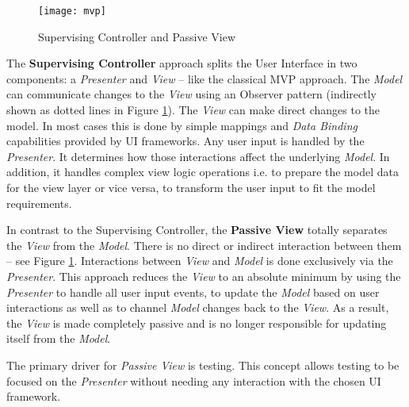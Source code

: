 \begin{figure}[!t]
\centering
\texttt{[image: mvp]}
\caption{Supervising Controller and Passive View}
\label{fig:mvp}
\end{figure}

The \textbf{Supervising Controller} approach splits the User Interface in two components: a \emph{Presenter} and \emph{View} – like the classical MVP approach. The \emph{Model} can communicate changes to the \emph{View} using an Observer pattern (indirectly shown as dotted lines in Figure \ref{fig:mvp}). The \emph{View} can make direct changes to the model. In most cases this is done by simple mappings and \emph{Data Binding} capabilities provided by UI frameworks. Any user input is handled by the \emph{Presenter}. It determines how those interactions affect the underlying \emph{Model}. In addition, it handles complex view logic operations i.e. to prepare the model data for the view layer or vice versa, to transform the user input to fit the model requirements.

In contrast to the Supervising Controller, the \textbf{Passive View} totally separates the \emph{View} from the \emph{Model}. There is no direct or indirect interaction between them -- see Figure \ref{fig:mvp}. Interactions between \emph{View} and \emph{Model} is done exclusively via the \emph{Presenter}. This approach reduces the \emph{View} to an absolute minimum by using the \emph{Presenter} to handle all user input events, to update the \emph{Model} based on user interactions as well as to channel \emph{Model} changes back to the \emph{View}. As a result, the \emph{View} is made completely passive and is no longer responsible for updating itself from the \emph{Model}.

The primary driver for \emph{Passive View} is testing. This concept allows testing to be focused on the \emph{Presenter} without needing any interaction with the chosen UI framework.

